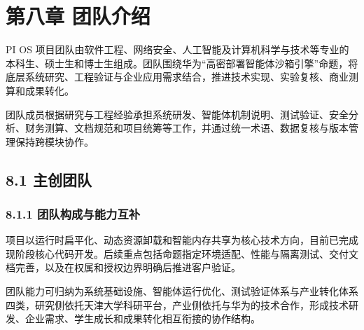 \section{第八章 团队介绍}\label{ux7b2cux516bux7ae0-ux56e2ux961fux4ecbux7ecd}

PI OS 项目团队由软件工程、网络安全、人工智能及计算机科学与技术等专业的本科生、硕士生和博士生组成。团队围绕华为``高密部署智能体沙箱引擎''命题，将底层系统研究、工程验证与企业应用需求结合，推进技术实现、实验复核、商业测算和成果转化。

团队成员根据研究与工程经验承担系统研发、智能体机制说明、测试验证、安全分析、财务测算、文档规范和项目统筹等工作，并通过统一术语、数据复核与版本管理保持跨模块协作。

\subsection{8.1 主创团队}\label{ux4e3bux521bux56e2ux961f}

\subsubsection{8.1.1 团队构成与能力互补}\label{ux56e2ux961fux6784ux6210ux4e0eux80fdux529bux4e92ux8865}

项目以运行时扁平化、动态资源卸载和智能内存共享为核心技术方向，目前已完成现阶段核心代码开发。后续重点包括命题指定环境适配、性能与隔离测试、交付文档完善，以及在权属和授权边界明确后推进客户验证。

团队能力可归纳为系统基础设施、智能体运行优化、测试验证体系与产业转化体系四类，研究侧依托天津大学科研平台，产业侧依托与华为的技术合作，形成技术研发、企业需求、学生成长和成果转化相互衔接的协作结构。

